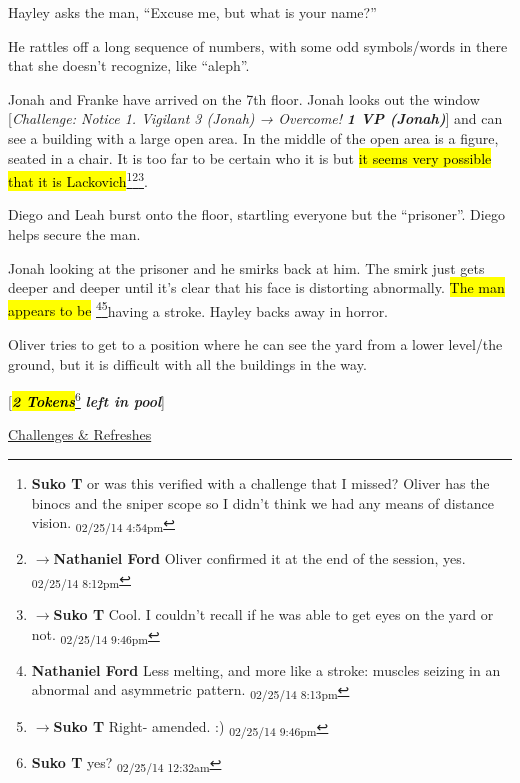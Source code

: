 Hayley asks the man, ``Excuse me, but what is your name?''

He rattles off a long sequence of numbers, with some odd symbols/words in there that she doesn't recognize, like ``aleph''.  



Jonah and Franke have arrived on the 7th floor.  Jonah looks out the window {[}\textit{Challenge: Notice 1. Vigilant 3 (Jonah)  → Overcome! }\textit{\textbf{1 VP (Jonah)}}{]} and can see a building with a large open area.  In the middle of the open area is a figure, seated in a chair.  It is too far to be certain who it is but \hl{it seems very possible that it is Lackovich}\footnote{\textbf{Suko T }or was this verified with a challenge that I missed?  Oliver has the binocs and the sniper scope so I didn't think we had any means of distance vision. \textsubscript{02/25/14 4:54pm}}\footnote{$\rightarrow$\textbf{Nathaniel Ford }Oliver confirmed it at the end of the session, yes. \textsubscript{02/25/14 8:12pm}}\footnote{$\rightarrow$\textbf{Suko T }Cool.  I couldn't recall if he was able to get eyes on the yard or not. \textsubscript{02/25/14 9:46pm}}.



Diego and Leah burst onto the floor, startling everyone but the ``prisoner''.  Diego helps secure the man.



Jonah looking at the prisoner and he smirks back at him.  The smirk just gets deeper and deeper until it's clear that his face is distorting abnormally.  \hl{The man appears to be }\footnote{\textbf{Nathaniel Ford }Less melting, and more like a stroke: muscles seizing in an abnormal and asymmetric pattern. \textsubscript{02/25/14 8:13pm}}\footnote{$\rightarrow$\textbf{Suko T }Right- amended. :) \textsubscript{02/25/14 9:46pm}}having a stroke.  Hayley backs away in horror.



Oliver tries to get to a position where he can see the yard from a lower level/the ground, but it is difficult with all the buildings in the way.



{[}\textit{\textbf{\hl{2 Tokens}}}\footnote{\textbf{Suko T }yes? \textsubscript{02/25/14 12:32am}}\textit{\textbf{ left in pool}}{]}





\underline{  {\LARGE Challenges \& Refreshes }  }



